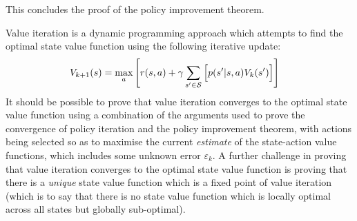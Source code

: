 This concludes the proof of the policy improvement theorem.

Value iteration is a dynamic programming approach which attempts to find the optimal state value function using the following iterative update:
\begin{align*}
    V_{k+1}(s) &= \max_a{\left[ r(s, a) + \gamma\sum_{s'\in\mathcal{S}}{\Bigl[ p(s'\vert s, a) V_k(s') \Bigr]} \right]}
\end{align*}
It should be possible to prove that value iteration converges to the optimal state value function using a combination of the arguments used to prove the convergence of policy iteration and the policy improvement theorem, with actions being selected so as to maximise the current \emph{estimate} of the state-action value functions, which includes some unknown error $\varepsilon_k$. A further challenge in proving that value iteration converges to the optimal state value function is proving that there is a \emph{unique} state value function which is a fixed point of value iteration (which is to say that there is no state value function which is locally optimal across all states but globally sub-optimal).
